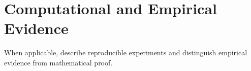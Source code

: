 \section{Computational and Empirical Evidence}
\label{sec:experiments}

When applicable, describe reproducible experiments and distinguish empirical
evidence from mathematical proof.

